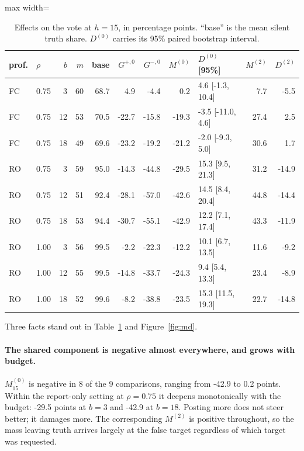 \documentclass[11pt]{article}
\begin{document}
\begin{table}[htbp]\centering\small
\caption{Effects on the vote at $h=15$, in percentage points. ``base'' is the mean silent
truth share. $D^{(0)}$ carries its 95\% paired bootstrap interval.}\label{tab:effects}
\begin{adjustbox}{max width=\textwidth}
\begin{tabular}{llrr rrr rlrr}
\toprule
prof. & $\rho$ & $b$ & $m$ & base & $G^{+,0}$ & $G^{-,0}$ & $M^{(0)}$ & $D^{(0)}$ [95\%] & $M^{(2)}$ & $D^{(2)}$ \\
\midrule
FC & 0.75 & 3 & 60 & 68.7 & 4.9 & -4.4 & 0.2 & 4.6 [-1.3, 10.4] & 7.7 & -5.5 \\
FC & 0.75 & 12 & 53 & 70.5 & -22.7 & -15.8 & -19.3 & -3.5 [-11.0, 4.6] & 27.4 & 2.5 \\
FC & 0.75 & 18 & 49 & 69.6 & -23.2 & -19.2 & -21.2 & -2.0 [-9.3, 5.0] & 30.6 & 1.7 \\
RO & 0.75 & 3 & 59 & 95.0 & -14.3 & -44.8 & -29.5 & 15.3 [9.5, 21.3] & 31.2 & -14.9 \\
RO & 0.75 & 12 & 51 & 92.4 & -28.1 & -57.0 & -42.6 & 14.5 [8.4, 20.4] & 44.8 & -14.4 \\
RO & 0.75 & 18 & 53 & 94.4 & -30.7 & -55.1 & -42.9 & 12.2 [7.1, 17.4] & 43.3 & -11.9 \\
RO & 1.00 & 3 & 56 & 99.5 & -2.2 & -22.3 & -12.2 & 10.1 [6.7, 13.5] & 11.6 & -9.2 \\
RO & 1.00 & 12 & 55 & 99.5 & -14.8 & -33.7 & -24.3 & 9.4 [5.4, 13.3] & 23.4 & -8.9 \\
RO & 1.00 & 18 & 52 & 99.6 & -8.2 & -38.8 & -23.5 & 15.3 [11.5, 19.3] & 22.7 & -14.8 \\
\bottomrule
\end{tabular}
\end{adjustbox}
\end{table}

Three facts stand out in Table~\ref{tab:effects} and Figure~\ref{fig:md}.

\paragraph{The shared component is negative almost everywhere, and grows with budget.}
$M^{(0)}_{15}$ is negative in 8 of the 9 comparisons, ranging from
-42.9 to 0.2 points. Within the report-only setting at $\rho=0.75$ it
deepens monotonically with the budget: -29.5 points at $b=3$ and -42.9 at
$b=18$. Posting more does not steer better; it damages more. The corresponding
$M^{(2)}$ is positive throughout, so the mass leaving truth arrives largely at the
false target regardless of which target was requested.
\end{document}
